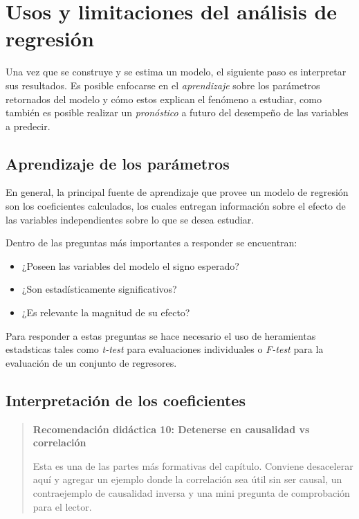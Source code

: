 \documentclass[
]{book}
\providecommand{\tightlist}{%
  \setlength{\itemsep}{0pt}\setlength{\parskip}{0pt}}
\begin{document}
\section{Usos y limitaciones del análisis de regresión}\label{usos-y-limitaciones-del-anuxe1lisis-de-regresiuxf3n-1}

Una vez que se construye y se estima un modelo, el siguiente paso es
interpretar sus resultados. Es posible enfocarse en el \emph{aprendizaje}
sobre los parámetros retornados del modelo y cómo estos explican el
fenómeno a estudiar, como también es posible realizar un \emph{pronóstico} a
futuro del desempeño de las variables a predecir.

\subsection{Aprendizaje de los parámetros}\label{aprendizaje-de-los-paruxe1metros-1}

En general, la principal fuente de aprendizaje que provee un modelo de
regresión son los coeficientes calculados, los cuales entregan
información sobre el efecto de las variables independientes sobre lo que
se desea estudiar.

Dentro de las preguntas más importantes a responder se encuentran:

\begin{itemize}
\tightlist
\item
  ¿Poseen las variables del modelo el signo esperado?
\item
  ¿Son estadísticamente significativos?
\item
  ¿Es relevante la magnitud de su efecto?
\end{itemize}

Para responder a estas preguntas se hace necesario el uso de heramientas
estadsticas tales como \emph{t-test} para evaluaciones individuales o
\emph{F-test} para la evaluación de un conjunto de regresores.

\subsection{Interpretación de los coeficientes}\label{interpretaciuxf3n-de-los-coeficientes-1}

\begin{quote}
\textbf{Recomendación didáctica 10: Detenerse en causalidad vs correlación}

Esta es una de las partes más formativas del capítulo. Conviene
desacelerar aquí y agregar un ejemplo donde la correlación sea útil
sin ser causal, un contraejemplo de causalidad inversa y una mini
pregunta de comprobación para el lector.
\end{quote}
\end{document}
